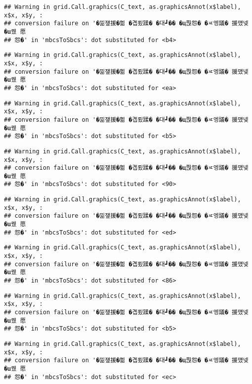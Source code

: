 \documentclass[
]{article}
\begin{document}
\begin{verbatim}
## Warning in grid.Call.graphics(C_text, as.graphicsAnnot(x$label), x$x, x$y, :
## conversion failure on '�낆쟾援�쁾 �곕룄蹂� �대┛�� �щ쭩怨� �ㅼ엥議� 援먰넻�ш퀬 愿
## 怨�' in 'mbcsToSbcs': dot substituted for <b4>
\end{verbatim}

\begin{verbatim}
## Warning in grid.Call.graphics(C_text, as.graphicsAnnot(x$label), x$x, x$y, :
## conversion failure on '�낆쟾援�쁾 �곕룄蹂� �대┛�� �щ쭩怨� �ㅼ엥議� 援먰넻�ш퀬 愿
## 怨�' in 'mbcsToSbcs': dot substituted for <ea>
\end{verbatim}

\begin{verbatim}
## Warning in grid.Call.graphics(C_text, as.graphicsAnnot(x$label), x$x, x$y, :
## conversion failure on '�낆쟾援�쁾 �곕룄蹂� �대┛�� �щ쭩怨� �ㅼ엥議� 援먰넻�ш퀬 愿
## 怨�' in 'mbcsToSbcs': dot substituted for <b5>
\end{verbatim}

\begin{verbatim}
## Warning in grid.Call.graphics(C_text, as.graphicsAnnot(x$label), x$x, x$y, :
## conversion failure on '�낆쟾援�쁾 �곕룄蹂� �대┛�� �щ쭩怨� �ㅼ엥議� 援먰넻�ш퀬 愿
## 怨�' in 'mbcsToSbcs': dot substituted for <90>
\end{verbatim}

\begin{verbatim}
## Warning in grid.Call.graphics(C_text, as.graphicsAnnot(x$label), x$x, x$y, :
## conversion failure on '�낆쟾援�쁾 �곕룄蹂� �대┛�� �щ쭩怨� �ㅼ엥議� 援먰넻�ш퀬 愿
## 怨�' in 'mbcsToSbcs': dot substituted for <ed>
\end{verbatim}

\begin{verbatim}
## Warning in grid.Call.graphics(C_text, as.graphicsAnnot(x$label), x$x, x$y, :
## conversion failure on '�낆쟾援�쁾 �곕룄蹂� �대┛�� �щ쭩怨� �ㅼ엥議� 援먰넻�ш퀬 愿
## 怨�' in 'mbcsToSbcs': dot substituted for <86>
\end{verbatim}

\begin{verbatim}
## Warning in grid.Call.graphics(C_text, as.graphicsAnnot(x$label), x$x, x$y, :
## conversion failure on '�낆쟾援�쁾 �곕룄蹂� �대┛�� �щ쭩怨� �ㅼ엥議� 援먰넻�ш퀬 愿
## 怨�' in 'mbcsToSbcs': dot substituted for <b5>
\end{verbatim}

\begin{verbatim}
## Warning in grid.Call.graphics(C_text, as.graphicsAnnot(x$label), x$x, x$y, :
## conversion failure on '�낆쟾援�쁾 �곕룄蹂� �대┛�� �щ쭩怨� �ㅼ엥議� 援먰넻�ш퀬 愿
## 怨�' in 'mbcsToSbcs': dot substituted for <ec>
\end{verbatim}
\end{document}
